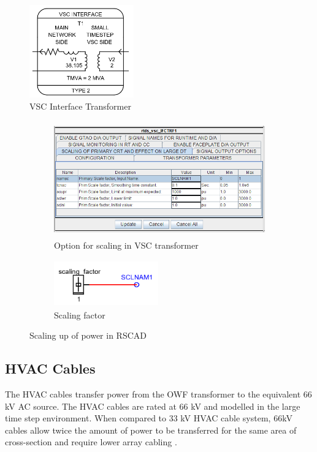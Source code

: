 \begin{figure}[H]
\centering
    \includegraphics[height = 4cm,width = 4.5cm]{Diagrams/Chapter_3/VSC_interface_trafo_smalldt.PNG}
    \caption{VSC Interface Transformer}
    \label{fig:VSC_interface_trafo_smalldt}
\end{figure}
\vspace{0 mm}
\begin{figure}[H]
\centering
\begin{subfigure}{.55\textwidth}
  \centering
  \includegraphics[height=5cm,width=10cm]{Diagrams/Chapter_3/VSC_interface_trafo_scaling.PNG}
  \caption{Option for scaling in VSC transformer}
  \label{fig:VSC_interface_trafo_scaling}
\end{subfigure}%
\begin{subfigure}{.5\textwidth}
  \centering
  \includegraphics[height=2cm,width=4.5cm]{Diagrams/Chapter_3/scaling_factor_RSCAD.PNG}
  \caption{Scaling factor}
  \label{fig:scaling_factor_RSCAD}
\end{subfigure}
\caption{Scaling up of power in RSCAD}
\label{fig:VSC_trafo_options}
\end{figure}

\subsection{HVAC Cables}\label{HVAC_cable_RSCAD}
The \gls{HVAC} cables transfer power from the \gls{OWF} transformer to the  equivalent 66 kV \gls{AC} source. The \gls{HVAC} cables are rated at 66 kV and modelled in the large time step environment. When compared to 33 kV \gls{HVAC} cable system, 66kV cables allow twice the amount of power to be transferred for the same area of cross-section and require lower array cabling \cite{dnv66kv}. 
 
